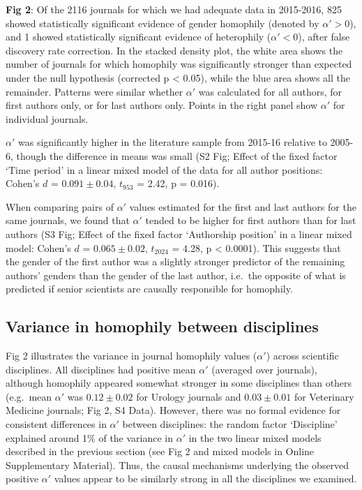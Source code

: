 \documentclass[12pt,]{article}
\begin{document}
\vspace{2cm}

\textbf{Fig 2}: Of the 2116 journals for which we had adequate data in
2015-2016, 825 showed statistically significant evidence of gender
homophily (denoted by \(\alpha' > 0\)), and 1 showed statistically
significant evidence of heterophily (\(\alpha' < 0\)), after false
discovery rate correction. In the stacked density plot, the white area
shows the number of journals for which homophily was significantly
stronger than expected under the null hypothesis (corrected p
\textless{} 0.05), while the blue area shows all the remainder. Patterns
were similar whether \(\alpha'\) was calculated for all authors, for
first authors only, or for last authors only. Points in the right panel
show \(\alpha'\) for individual journals. \vspace{2cm}

\(\alpha'\) was significantly higher in the literature sample from
2015-16 relative to 2005-6, though the difference in means was small (S2
Fig; Effect of the fixed factor `Time period' in a linear mixed model of
the data for all author positions: Cohen's \(d\) = \(0.091{\pm}0.04\),
\(t_{953}\) = 2.42, p = 0.016).

When comparing pairs of \(\alpha'\) values estimated for the first and
last authors for the same journals, we found that \(\alpha'\) tended to
be higher for first authors than for last authors (S3 Fig; Effect of the
fixed factor `Authorship position' in a linear mixed model: Cohen's
\(d\) = \(0.065{\pm}0.02\), \(t_{2024}\) = 4.28, p \textless{} 0.0001).
This suggests that the gender of the first author was a slightly
stronger predictor of the remaining authors' genders than the gender of
the last author, i.e.~the opposite of what is predicted if senior
scientists are causally responsible for homophily.

\hypertarget{variance-in-homophily-between-disciplines}{%
\subsection{Variance in homophily between
disciplines}\label{variance-in-homophily-between-disciplines}}

Fig 2 illustrates the variance in journal homophily values (\(\alpha'\))
across scientific disciplines. All disciplines had positive mean
\(\alpha'\) (averaged over journals), although homophily appeared
somewhat stronger in some disciplines than others (e.g.~mean \(\alpha'\)
was \(0.12{\pm}0.02\) for Urology journals and \(0.03{\pm}0.01\) for
Veterinary Medicine journals; Fig 2, S4 Data). However, there was no
formal evidence for consistent differences in \(\alpha'\) between
disciplines: the random factor `Discipline' explained around 1\% of the
variance in \(\alpha'\) in the two linear mixed models described in the
previous section (see Fig 2 and mixed models in Online Supplementary
Material). Thus, the causal mechanisms underlying the observed positive
\(\alpha'\) values appear to be similarly strong in all the disciplines
we examined.
\end{document}
